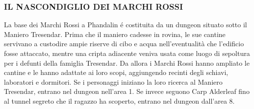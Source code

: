 \documentclass{article}
\begin{document}
\subsubsection{IL NASCONDIGLIO
DEI MARCHI ROSSI}
La base dei Marchi Rossi a Phandalin é costituita da un
dungeon situato sotto il Maniero Tresendar. Prima che
il maniero cadesse in rovina, le sue cantine servivano a
custodire ampie riserve di cibo e acqua nell'eventualità che
l’edificio fosse attaccato, mentre una cripta adiacente veniva
usata come luogo di sepoltura per i defunti della famiglia
Tresendar. Da allora i Marchi Rossi hanno ampliato le
cantine e le hanno adattate ai loro scopi, aggiungendo recinti
degli schiavi, laboratori e dormitori.
Se i personaggi iniziano la loro ricerca al Maniero
Tresendar, entrano nel dungeon nell’area 1. Se invece
seguono Carp Alderleaf fino al tunnel segreto che il ragazzo
ha scoperto, entrano nel dungeon dall'area 8.
\end{document}
